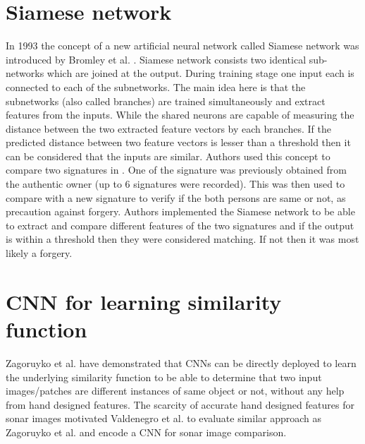 \section{Siamese network}
In 1993 the concept of a new artificial neural network called Siamese network was introduced by Bromley et al. \cite{bromley1994signature}. Siamese network consists two identical sub-networks which are joined at the output.
During training stage one input each is connected to each of the subnetworks. The main idea here is that the subnetworks (also called branches) are trained simultaneously and extract features from the inputs.
While the shared neurons are capable of measuring the distance between the two extracted feature vectors by each branches. If the predicted distance between two feature vectors is lesser than a threshold then it can be considered 
that the inputs are similar. Authors used this concept to compare two signatures in \cite{bromley1994signature}. One of the signature was previously obtained from the authentic owner (up to 6 signatures were recorded). This was then used to compare with a new signature
to verify if the both persons are same or not, as precaution against forgery. Authors implemented the Siamese network to be able to extract and compare different features of the two signatures and if the output is within a threshold then
they were considered matching. If not then it was most likely a forgery.

\section{CNN for learning similarity function}

Zagoruyko et al. have demonstrated that CNNs can be directly deployed to learn the underlying similarity function to be able to determine that two input images/patches are different instances of same object or not, 
without any help from hand designed features. The scarcity of accurate hand designed features for sonar images motivated Valdenegro et al. to evaluate similar approach as Zagoruyko et al. and encode a CNN for sonar image comparison.

